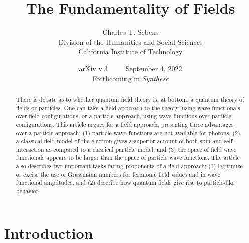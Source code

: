 \documentclass[onecolumn,secnumarabic,amsmath,amssymb,balancelastpage,nofootinbib,12pt]{article}
\begin{document}
\sloppy %




\title{\vspace*{-35 pt}\Huge{The Fundamentality of Fields}}
\author{Charles T. Sebens\\Division of the Humanities and Social Sciences\\ California Institute of Technology}
\date{\vspace*{-6 pt}arXiv v.3\ \ \ \ \ September 4, 2022\vspace*{10 pt}\\Forthcoming in \emph{Synthese}}


\maketitle
\begin{abstract}
There is debate as to whether quantum field theory is, at bottom, a quantum theory of fields or particles.  One can take a field approach to the theory, using wave functionals over field configurations, or a particle approach, using wave functions over particle configurations.  This article argues for a field approach, presenting three advantages over a particle approach: (1) particle wave functions are not available for photons, (2) a classical field model of the electron gives a superior account of both spin and self-interaction as compared to a classical particle model, and (3) the space of field wave functionals appears to be larger than the space of particle wave functions.  The article also describes two important tasks facing proponents of a field approach: (1) legitimize or excise the use of Grassmann numbers for fermionic field values and in wave functional amplitudes, and (2) describe how quantum fields give rise to particle-like behavior.
\end{abstract}

\newpage

\tableofcontents
\newpage


\section{Introduction}\label{introsec}
\end{document}
